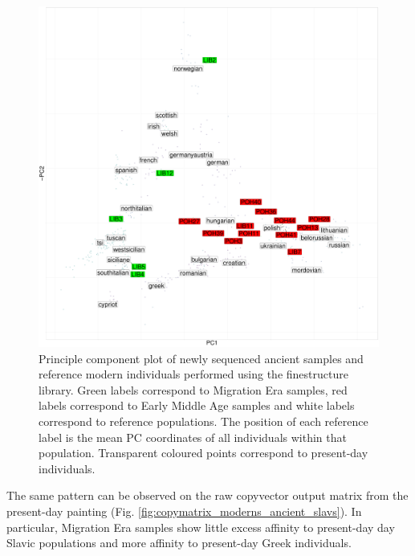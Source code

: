 \begin{figure}[htp]
    \centering
    \includegraphics[width=1.0\textwidth]{../images/chapter5/chunklengths_moderns_ancients_PCA.pdf}
    \caption{Principle component plot of newly sequenced ancient samples and reference modern individuals performed using the finestructure library. Green labels correspond to Migration Era samples, red labels correspond to Early Middle Age samples and white labels correspond to reference populations. The position of each reference label is the mean PC coordinates of all individuals within that population. Transparent coloured points correspond to present-day individuals.}
    \label{fig:chunklengths_moderns_ancients_PCA}
\end{figure}

The same pattern can be observed on the raw copyvector output matrix from the present-day painting (Fig. \ref{fig:copymatrix_moderns_ancient_slavs}). In particular, Migration Era samples show little excess affinity to present-day day Slavic populations and more affinity to present-day Greek individuals. 

